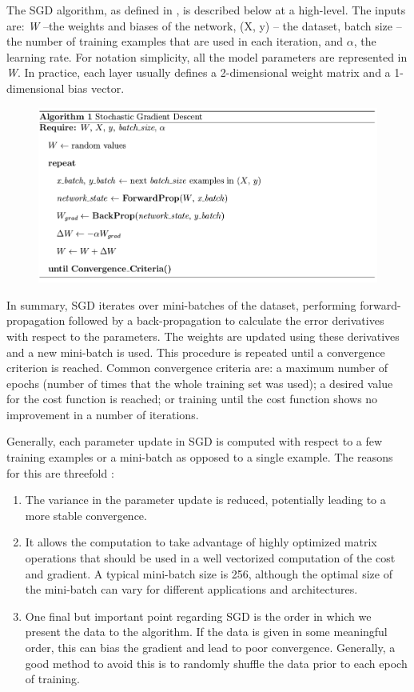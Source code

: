 The SGD algorithm, as defined in \cite{duda2012pattern}, is described below at a high-level. The inputs
are: \textit{W} --the weights and biases of the network, (X, y) -- the dataset, batch size -- the number of training examples that are used in each iteration, and $\alpha$, the learning rate. For notation simplicity, all the model parameters are represented in \textit{W}. In practice, each
layer usually defines a 2-dimensional weight matrix and a 1-dimensional bias vector.

\begin{figure}[H]
	\centering
	{\includegraphics[width=1\textwidth]{images/sgd}}
	\label{fig:sgd}
\end{figure}
In summary, SGD iterates over mini-batches of the dataset, performing forward-propagation followed by a back-propagation to calculate the error derivatives with respect to the parameters. The weights are updated using these derivatives and a new mini-batch is used. This procedure is repeated until a convergence criterion is reached. Common convergence criteria are: a maximum number of epochs (number of times that the whole training set was used); a desired value for the cost function is reached; or training until the cost function shows no improvement in a number of iterations.

Generally, each parameter update in SGD is computed with respect to a few training examples or a mini-batch as opposed to a single example. The reasons for this are threefold \cite{sgd}:
\begin{enumerate}
	\item The variance in the parameter update is reduced, potentially leading to a more stable convergence. 
	\item It allows the computation to take advantage of highly optimized matrix operations that should be used in a well vectorized computation of the cost and gradient.  A typical mini-batch size is 256, although the optimal size of the mini-batch can vary for different applications and architectures.
	\item One final but important point regarding SGD is the order in which we present the data to the algorithm. If the data is given in some meaningful order, this can bias the gradient and lead to poor convergence. Generally, a good method to avoid this is to randomly shuffle the data prior to each epoch of training.
\end{enumerate}


